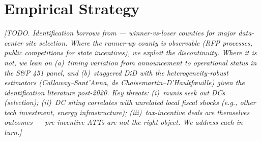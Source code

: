 \section{Empirical Strategy}\label{sec:empirical}

\noindent\textit{[TODO. Identification borrows from \citet{greenstone2010_milliondollar} — winner-vs-loser counties for major data-center site selection. Where the runner-up county is observable (RFP processes, public competitions for state incentives), we exploit the discontinuity. Where it is not, we lean on (a)~timing variation from announcement to operational status in the S\&P 451 panel, and (b)~staggered DiD with the heterogeneity-robust estimators (Callaway--Sant'Anna, de Chaisemartin--D'Haultf\oe{}uille) given the identification literature post-2020. Key threats: (i)~munis seek out DCs (selection); (ii)~DC siting correlates with unrelated local fiscal shocks (e.g., other tech investment, energy infrastructure); (iii)~tax-incentive deals are themselves outcomes — pre-incentive ATTs are not the right object. We address each in turn.]}
